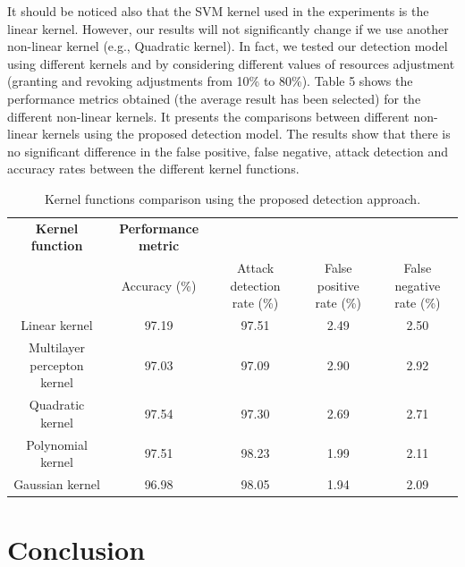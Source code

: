 \documentclass[twocolumn]{bmcart}%
\begin{document}
It should be noticed also that the SVM kernel used in the experiments is the linear kernel. However, our results will not significantly change if we use another non-linear kernel (e.g., Quadratic kernel). In fact, we tested our detection model using different kernels and by considering different values of resources adjustment (granting and revoking adjustments from 10\% to 80\%). Table 5 shows the performance metrics obtained (the average result has been selected) for the different non-linear kernels. It presents the comparisons between different non-linear kernels using the proposed detection model. The results show that there is no significant difference in the false positive, false negative, attack detection and accuracy rates between the different kernel functions.

\begin{table}[ht]\small \small
\caption{Kernel functions comparison using the proposed detection approach.}
\centering
 \begin{tabular}{c c c c c}
 \hline
 \textbf{Kernel function} & \textbf{Performance metric} & & & \\
    & Accuracy (\%) & Attack detection rate (\%) & False positive rate (\%) & False negative rate (\%)  \\
 \hline
  Linear kernel & 97.19 & 97.51 & 2.49 &  2.50  \\
  Multilayer percepton kernel &97.03 & 97.09 & 2.90 & 2.92  \\
  Quadratic kernel & 97.54 & 97.30 & 2.69 & 2.71  \\
  Polynomial kernel &97.51 & 98.23 &1.99 &2.11   \\
  Gaussian kernel &96.98 &98.05 &1.94 & 2.09  \\
\end{tabular}
\end{table}

\section{Conclusion}
\end{document}
